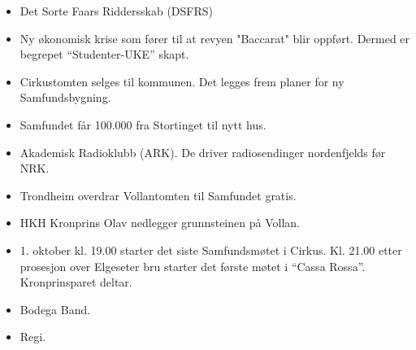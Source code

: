 \begin{itemize}
  \item Det Sorte Faars Riddersskab (DSFRS)
\end{itemize}


\begin{itemize}
  \item Ny økonomisk krise som fører til at revyen "Baccarat" blir oppført. Dermed er begrepet ``Studenter-UKE'' skapt.
\end{itemize}


\begin{itemize}
  \item Cirkustomten selges til kommunen. Det legges frem planer for ny Samfundsbygning.
\end{itemize}


\begin{itemize}
  \item Samfundet får 100.000 fra Stortinget til nytt hus.
\end{itemize}


\begin{itemize}
  \item Akademisk Radioklubb (ARK). De driver radiosendinger nordenfjelds før NRK.
\end{itemize}


\begin{itemize}
  \item Trondheim overdrar Vollantomten til Samfundet gratis.
\end{itemize}


\begin{itemize}
  \item HKH Kronprins Olav nedlegger grunnsteinen på Vollan.
\end{itemize}


\begin{itemize}
  \item 1. oktober kl. 19.00 starter det siste Samfundsmøtet i Cirkus. Kl. 21.00 etter prosesjon over Elgeseter bru starter
det første møtet i ``Cassa Rossa''. Kronprinsparet deltar.
  \item Bodega Band.
  \item Regi.
\end{itemize}

